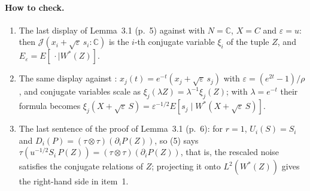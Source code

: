 \documentclass[11pt]{article}
\newcommand{\ploc}[2]{#1}
\newcommand{\sloc}[2]{\cite[#2]{#1}}
\begin{document}
\paragraph{How to check.}
\begin{enumerate}
\item The last display of \ploc{Lemma~3.1 (p.~5)}{03-fisher.tex:45--48}
against \sloc{MajorShlyakhtenko2025-StrongOneBoundedNonMicrostates}{\S2.1, p.~4}
with $N=\mathbb C$, $X=C$ and $\varepsilon=u$: then
$\mathcal J(x_i+\sqrt\varepsilon\,s_i:\mathbb C)$ is the $i$-th conjugate
variable $\xi_i$ of the tuple $Z$, and $E_\varepsilon=E[\,\cdot\mid W^*(Z)]$.
\item The same display against
\sloc{FathiNelson2016-FreeSteinKernelsFreeLSI}{p.~7}: $x_j(t)=e^{-t}(x_j+\sqrt\varepsilon\,s_j)$
with $\varepsilon=(e^{2t}-1)/\rho$, and conjugate variables scale as
$\xi_j(\lambda Z)=\lambda^{-1}\xi_j(Z)$; with $\lambda=e^{-t}$ their formula
becomes $\xi_j(X+\sqrt\varepsilon\,S)=\varepsilon^{-1/2}E[s_j\mid W^*(X+\sqrt\varepsilon\,S)]$.
\item The last sentence of the proof of Lemma~3.1
\ploc{(p.~6)}{03-fisher.tex:95--97}: for $r=1$, $U_i(S)=S_i$ and
$D_i(P)=(\tau\otimes\tau)(\partial_iP(Z))$, so \ploc{(5)}{03-fisher.tex:42--44} says
$\tau(u^{-1/2}S_i\,P(Z))=(\tau\otimes\tau)(\partial_iP(Z))$, that is, the
rescaled noise satisfies the conjugate relations of $Z$; projecting it onto
$L^2(W^*(Z))$ gives the right-hand side in item~1.
\end{enumerate}

\space%
\end{document}
